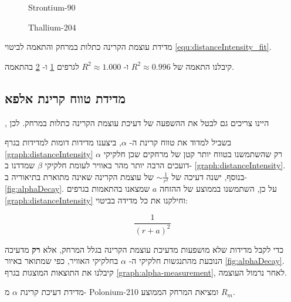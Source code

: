 \documentclass{article}
\begin{document}
\begin{graph}[H]
    \centering
    \begin{subfigure}[b]{0.49\textwidth}
    	\centering
    	\resizebox{\textwidth}{!}{}
    	\caption{\textenglish{Strontium-90}}
    	\label{graph:ISL_Sr-90}
    \end{subfigure}
    \hfill
    \begin{subfigure}[b]{0.49\textwidth}
    	\centering
    	\resizebox{\textwidth}{!}{}
        \caption{\textenglish{Thallium-204}}
        \label{graph:ISL_Tl-204}
    \end{subfigure}
    \caption{
    מדידת עוצמת הקרינה כתלות במרחק והתאמה לביטוי
    \ref{equ:distanceIntensity_fit}.
    }
    \label{graph:distanceIntensity}
\end{graph}

קיבלנו התאמה של
$R^2 \approx 0.996$
ו-
$R^2 \approx 1.000$
לגרפים
\ref{graph:ISL_Sr-90}
ו-
\ref{graph:ISL_Tl-204}
בהתאמה.

\subsection{
מדידת טווח קרינת אלפא
}\label{sec:alpha-measurement},
היינו צריכים גם לבטל את ההשפעה של דעיכת עוצמת הקרינה כתלות במרחק. לכן

בשביל למדוד את טווח קרינת ה-
$\alpha$,
ביצענו מדידות דומות למדידות בגרף
\ref{graph:distanceIntensity}
רק שהשתמשנו בטווח יותר קטן של מרחקים שכן חלקיקי
$\alpha$
דועכים הרבה יותר מהר באוויר לעומת חלקיקי
$\beta$
שמדדנו ב-
\ref{graph:distanceIntensity}.
בנוסף, ישנה דעיכה של
$\sim \frac{1}{r^2}$
של עוצמת הקרינה שאינה מתוארת בתיאוריה ב-
\ref{fig:alphaDecay}.
על כן, השתמשנו בממוצע של ההזחה
$a$
שמצאנו בהתאמות בגרפים
\ref{graph:distanceIntensity}
וחילקנו את כל מדידה בביטוי:

$$ \frac{1}{(r+a)^2}$$

כדי לקבל מדידות שלא מושפעות מדעיכת עוצמת הקרינה בגלל המרחק, אלא 
\textbf{
רק
}
מדעיכה הנובעת מהתנגשות חלקיקי ה-
$\alpha$
בחלקיקי האוויר, כפי שמתואר באיור
\ref{fig:alphaDecay}.
קיבלנו את התוצאות המוצגות בגרף
\ref{graph:alpha-measurement},
לאחר נרמול העוצמה.

\begin{graph}[H]
    	\centering
    	\resizebox{0.76\textwidth}{!}{}
    	\caption{
    	מדידת דעיכת קרינת
    	$\alpha$
    	מ-
    	\textenglish{Polonium-210}
    	ומציאת המרחק הממוצע
    	$R_m$.
    	}
    	\label{graph:alpha-measurement}
\end{graph}
\end{document}
